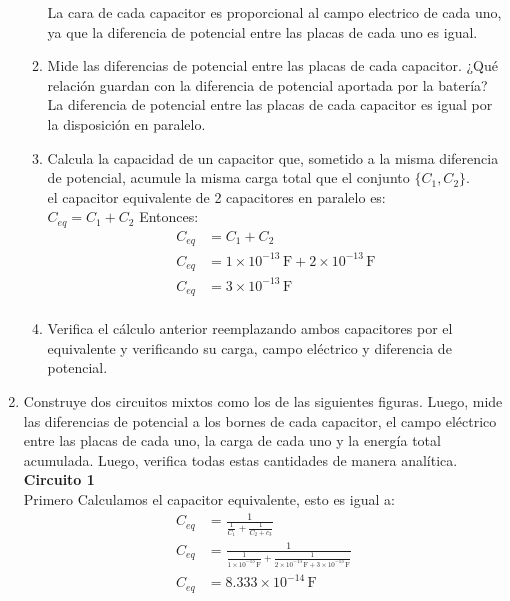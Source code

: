 \documentclass[12pt]{report}
\begin{document}
\begin{enumerate}
\begin{enumerate}
            La cara de cada capacitor es proporcional al campo electrico de cada uno, ya que la diferencia de potencial entre las placas de cada uno es igual.\\

        \item Mide las diferencias de potencial entre las placas de cada capacitor. ¿Qué relación guardan con la diferencia de potencial aportada por la batería?
            La diferencia de potencial entre las placas de cada capacitor es igual por la disposición en paralelo.\\
        \item Calcula la capacidad de un capacitor que, sometido a la misma diferencia de potencial, acumule la misma carga total que el conjunto $\{C_1, C_2\}$.\\
            el capacitor equivalente de 2 capacitores en paralelo es:\\
            $C_{eq}=C_1+C_2$ Entonces:\\

            \begin{align*}
                C_{eq}&=C_1+C_2\\[6pt]
                C_{eq}&= 1 \times 10^{-13} \, \text{F} +  2 \times 10^{-13} \, \text{F}\\[6pt]
                C_{eq}&= 3\times 10^{-13} \, \text{F}\\[12pt]
            \end{align*}



            
        \item Verifica el cálculo anterior reemplazando ambos capacitores por el equivalente y verificando su carga, campo eléctrico y diferencia de potencial.
    \end{enumerate}


\item Construye dos circuitos mixtos como los de las siguientes figuras. Luego, mide las diferencias de potencial a los bornes de cada capacitor, el campo eléctrico entre las placas de cada uno, la carga de cada uno y la energía total acumulada. Luego, verifica todas estas cantidades de manera analítica.\\




    \textbf{Circuito 1}\\
    Primero Calculamos el capacitor equivalente, esto es igual a:\\
\begin{align*}
    C_{eq}&=\frac{1}{\frac{1}{C_1}+\frac{1}{C_2+c_3}}\\[6pt]
    C_{eq}&=\frac{1}{\frac{1}{1 \times 10^{-13} \, \text{F} }+\frac{1}{2 \times 10^{-13} \, \text{F}+ 3 \times 10^{-13} \, \text{F}}}\\[6pt]
    C_{eq}&=8.333 \times 10^{-14} \, \text{F}\\[6pt]
\end{align*}


\end{enumerate}
\end{document}

